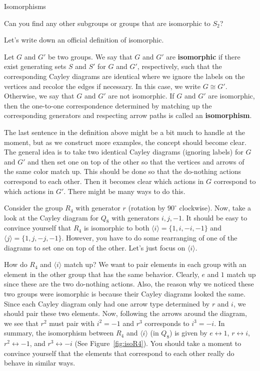 \begin{section}{Isomorphisms}
\begin{exercise}
Can you find any other subgroups or groups that are isomorphic to $S_2$?
\end{exercise}

Let's write down an official definition of isomorphic.

\begin{definition}
Let $G$ and $G'$ be two groups.  We say that $G$ and $G'$ are \textbf{isomorphic} if there exist generating sets $S$ and $S'$ for $G$ and $G'$, respectively, such that the corresponding Cayley diagrams are identical where we ignore the labels on the vertices and recolor the edges if necessary.  In this case, we write $G\cong G'$.  Otherwise, we say that $G$ and $G'$ are not isomorphic.  If $G$ and $G'$ are isomorphic, then the one-to-one correspondence determined by matching up the corresponding generators and respecting arrow paths is called an \textbf{isomorphism}.
\end{definition}

The last sentence in the definition above might be a bit much to handle at the moment, but as we construct more examples, the concept should become clear.  The general idea is to take two identical Cayley diagrams (ignoring labels) for $G$ and $G'$ and then set one on top of the other so that the vertices and arrows of the same color match up.  This should be done so that the do-nothing actions correspond to each other.  Then it becomes clear which actions in $G$ correspond to which actions in $G'$.  There might be many ways to do this.

Consider the group $R_4$ with generator $r$ (rotation by $90^\circ$ clockwise).  Now, take a look at the Cayley diagram for $Q_8$ with generators $i, j, -1$.  It should be easy to convince yourself that $R_4$ is isomorphic to both $\langle i\rangle=\{1,i,-i,-1\}$ and $\langle j\rangle=\{1,j,-j,-1\}$.  However, you have to do some rearranging of one of the diagrams to set one on top of the other.  Let's just focus on $\langle i\rangle$.  

How do $R_4$ and $\langle i\rangle$ match up?  We want to pair elements in each group with an element in the other group that has the same behavior.  Clearly, $e$ and $1$ match up since these are the two do-nothing actions.  Also, the reason why we noticed these two groups were isomorphic is because their Cayley diagrams looked the same.  Since each Cayley diagram only had one arrow type determined by $r$ and $i$, we should pair these two elements.  Now, following the arrows around the diagram, we see that $r^2$ must pair with $i^2=-1$ and $r^3$ corresponds to $i^3=-i$.  In summary, the isomorphism between $R_4$ and $\langle i\rangle$ (in $Q_8$) is given by $e\leftrightarrow 1$, $r\leftrightarrow i$, $r^2\leftrightarrow -1$, and $r^3\leftrightarrow -i$ (See Figure~\ref{fig:isoR4}).  You should take a moment to convince yourself that the elements that correspond to each other really do behave in similar ways.


\end{section}
